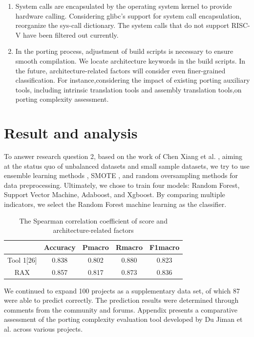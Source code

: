 \documentclass[sigconf,screen,review]{acmart}
\begin{document}
\begin{enumerate}
  \item System calls are encapsulated by the operating system kernel to provide hardware calling.
  Considering glibc's support for system call encapsulation, reorganize the sys-call dictionary.
  The system calls that do not support RISC-V have been filtered out currently.
  \item In the porting process, adjustment of build scripts is necessary to ensure smooth compilation.
  We locate architecture keywords in the build scripts.
  In the future, architecture-related factors will consider even finer-grained classification.
  For instance,considering the impact of existing porting auxiliary tools, including intrinsic translation tools and assembly translation tools,on porting complexity assessment.
\end{enumerate}

\section{Result and analysis}

To answer research question 2, based on the work of Chen Xiang et al. \cite{5128907}, aiming at the status quo of unbalanced datasets and small sample datasets, we try to use ensemble learning methods \cite{6509481}, SMOTE \cite{4271036}, and random oversampling methods for data preprocessing.
Ultimately, we chose to train four models: Random Forest, Support Vector Machine, Adaboost, and Xgboost.
By comparing multiple indicators, we select the Random Forest machine learning as the classifier.

\begin{table}
  \caption{The Spearman correlation coefficient of score and architecture-related factors}
  \label{tab:evaluation}
  \begin{tabular}{ccccc}
    \toprule
     & Accuracy & Pmacro & Rmacro & F1macro \\
    \midrule
    Tool 1[26] & 0.838 & 0.802 & 0.880 & 0.823 \\
    RAX & 0.857 & 0.817 & 0.873 & 0.836 \\
  \bottomrule
\end{tabular}
\end{table}

We continued to expand 100 projects as a supplementary data set, of which 87 were able to predict correctly.
The prediction results were determined through comments from the community and forums.
Appendix presents a comparative assessment of the porting complexity evaluation tool developed by Du Jiman et al. across various projects.
\end{document}
